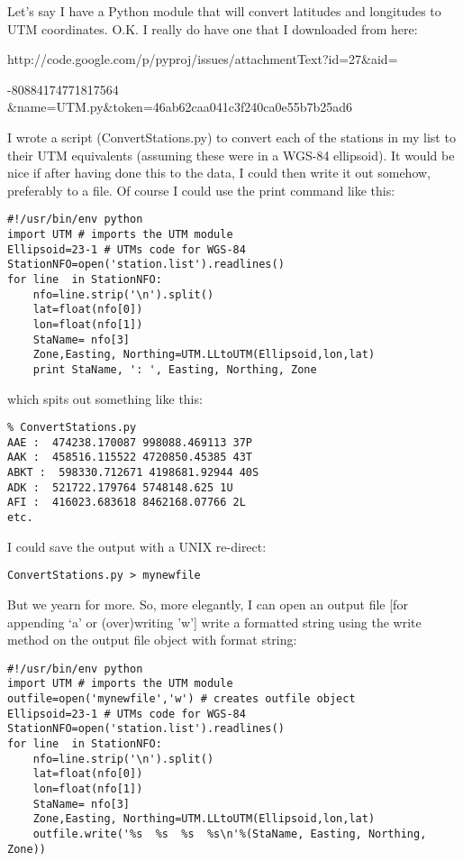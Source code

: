 {Let's say I have a Python module that will convert latitudes and longitudes to UTM coordinates.  O.K. I really do have one that I downloaded from here:  

http://code.google.com/p/pyproj/issues/attachmentText?id=27\&aid=
   
   -80884174771817564 \&name=UTM.py\&token=46ab62caa041c3f240ca0e55b7b25ad6

\noindent I wrote a script ({\color{blue}ConvertStations.py}) to convert each of the stations in my list to their UTM equivalents (assuming these were in a WGS-84 ellipsoid).  It would be nice if  after having done this to the data, I could then write it out somehow, preferably to a file.  Of course I could use the {\color{blue}print} command like this:


 {\singlespacing \color{blue} \begin{verbatim}
#!/usr/bin/env python
import UTM # imports the UTM module
Ellipsoid=23-1 # UTMs code for WGS-84
StationNFO=open('station.list').readlines()
for line  in StationNFO:
    nfo=line.strip('\n').split()
    lat=float(nfo[0])
    lon=float(nfo[1])
    StaName= nfo[3]
    Zone,Easting, Northing=UTM.LLtoUTM(Ellipsoid,lon,lat)
    print StaName, ': ', Easting, Northing, Zone
 \end{verbatim}}

\noindent
which spits out something like this: 

{\singlespacing \color{blue} \begin{verbatim}
% ConvertStations.py
AAE :  474238.170087 998088.469113 37P
AAK :  458516.115522 4720850.45385 43T
ABKT :  598330.712671 4198681.92944 40S
ADK :  521722.179764 5748148.625 1U
AFI :  416023.683618 8462168.07766 2L
etc.
\end{verbatim}}

\noindent 
I could save the output with a UNIX re-direct: 
 {\singlespacing \color{blue} \begin{verbatim}
ConvertStations.py > mynewfile
 \end{verbatim}}
 
But we yearn for more.  So,  more  elegantly, I can open an output file [for appending `a' or (over)writing 'w']  write a formatted string using the write method on  the output file object with format string:

 {\singlespacing \color{blue} \begin{verbatim}
#!/usr/bin/env python
import UTM # imports the UTM module
outfile=open('mynewfile','w') # creates outfile object
Ellipsoid=23-1 # UTMs code for WGS-84
StationNFO=open('station.list').readlines()
for line  in StationNFO:
    nfo=line.strip('\n').split()
    lat=float(nfo[0])
    lon=float(nfo[1])
    StaName= nfo[3]
    Zone,Easting, Northing=UTM.LLtoUTM(Ellipsoid,lon,lat)
    outfile.write('%s  %s  %s  %s\n'%(StaName, Easting, Northing, Zone))
\end{verbatim}}

}
